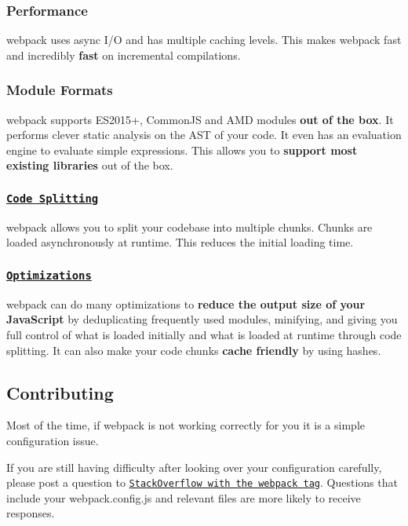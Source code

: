 \subsubsection*{Performance}

webpack uses async I/O and has multiple caching levels. This makes webpack fast and incredibly {\bfseries fast} on incremental compilations.

\subsubsection*{Module Formats}

webpack supports E\+S2015+, Common\+JS and A\+MD modules {\bfseries out of the box}. It performs clever static analysis on the A\+ST of your code. It even has an evaluation engine to evaluate simple expressions. This allows you to {\bfseries support most existing libraries} out of the box.

\subsubsection*{\href{https://webpack.js.org/guides/code-splitting/}{\tt Code Splitting}}

webpack allows you to split your codebase into multiple chunks. Chunks are loaded asynchronously at runtime. This reduces the initial loading time.

\subsubsection*{\href{https://webpack.js.org/guides/production-build/}{\tt Optimizations}}

webpack can do many optimizations to {\bfseries reduce the output size of your Java\+Script} by deduplicating frequently used modules, minifying, and giving you full control of what is loaded initially and what is loaded at runtime through code splitting. It can also make your code chunks {\bfseries cache friendly} by using hashes.

\subsection*{Contributing}

Most of the time, if webpack is not working correctly for you it is a simple configuration issue.

If you are still having difficulty after looking over your configuration carefully, please post a question to \href{https://stackoverflow.com/tags/webpack}{\tt Stack\+Overflow with the webpack tag}. Questions that include your webpack.\+config.\+js and relevant files are more likely to receive responses.

